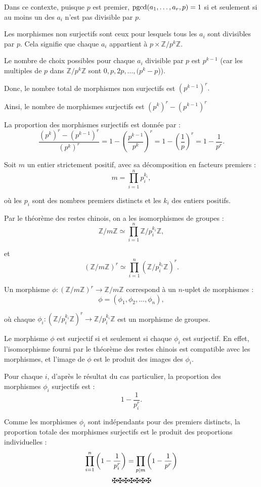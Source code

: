 Dans ce contexte, puisque $p$ est premier, $\operatorname{pgcd} (a_1, \ldots, a_r, p)
= 1$ si et seulement si au moins un des $a_i$ n'est pas divisible par $p$.

Les morphismes non surjectifs sont ceux pour lesquels tous les $a_i$ sont
divisibles par $p$. Cela signifie que chaque $a_i$ appartient {\`a} $p \times
\mathbb{Z}/ p^k \mathbb{Z}$.

Le nombre de choix possibles pour chaque $a_i$ divisible par $p$ est $p^{k -
1}$ (car les multiples de $p$ dans $\mathbb{Z}/ p^k \mathbb{Z}$ sont $0, p, 2
p, \ldots, (p^k - p$)).

Donc, le nombre total de morphismes non surjectifs est $(p^{k - 1})^r .$

Ainsi, le nombre de morphismes surjectifs est $(p^k)^r - (p^{k - 1})^r$

La proportion des morphismes surjectifs est donn{\'e}e par :
\[ \frac{(p^k)^r - (p^{k - 1})^r}{(p^k)^r} = 1 - \left( \frac{p^{k - 1}}{p^k}
   \right)^r = 1 - \left( \frac{1}{p} \right)^r = 1 - \frac{1}{p^r} . \]


Soit $m$ un entier strictement positif, avec
sa d{\'e}composition en facteurs premiers :
\[ m = \prod_{i = 1}^n p_i^{k_i}, \]


o{\`u} les $p_i$ sont des nombres premiers distincts et les $k_i$ des entiers
positifs.

Par le th{\'e}or{\`e}me des restes chinois, on a les isomorphismes de groupes
:
\[ \mathbb{Z}/ m\mathbb{Z} \simeq \prod_{i = 1}^n \mathbb{Z}/ p_i^{k_i}
   \mathbb{Z}, \]


et
\[ (\mathbb{Z}/ m\mathbb{Z})^r \simeq \prod_{i = 1}^n (\mathbb{Z}/ p_i^{k_i}
   \mathbb{Z})^r . \]


Un morphisme $\phi : (\mathbb{Z}/ m\mathbb{Z})^r \rightarrow \mathbb{Z}/
m\mathbb{Z}$ correspond {\`a} un $n$-uplet de morphismes :
\[ \phi = (\phi_1, \phi_2, \ldots, \phi_n), \]


o{\`u} chaque $\phi_i : (\mathbb{Z}/ p_i^{k_i} \mathbb{Z})^r \rightarrow
\mathbb{Z}/ p_i^{k_i} \mathbb{Z}$ est un morphisme de groupes.

Le morphisme $\phi$ est surjectif si et seulement si chaque $\phi_i$ est
surjectif. En effet, l'isomorphisme fourni par le th{\'e}or{\`e}me des restes
chinois est compatible avec les morphismes, et l'image de $\phi$ est le
produit des images des $\phi_i$.

Pour chaque $i$, d'apr{\`e}s le r{\'e}sultat du cas particulier, la proportion
des morphismes $\phi_i$ surjectifs est :
\[ 1 - \frac{1}{p_i^r} . \]


Comme les morphismes $\phi_i$ sont ind{\'e}pendants pour des premiers
distincts, la proportion totale des morphismes surjectifs est le produit des
proportions individuelles :
\[  \prod_{i = 1}^n \left( 1 - \frac{1}{p_i^r} \right) = \underset{p | m
   }{\prod} \left( 1 - \frac{1}{p^r} \right) \]
\[ \maltese \maltese \maltese \maltese \maltese \maltese \maltese \]

